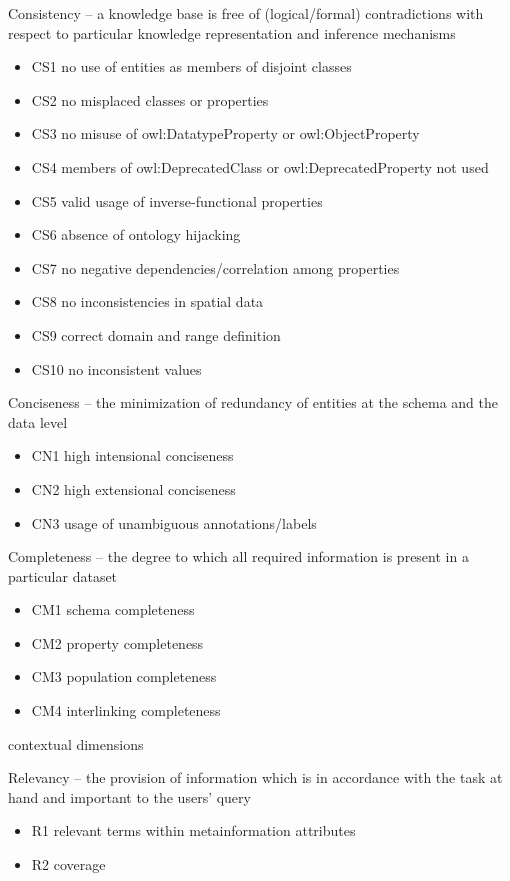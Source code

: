 Consistency -- a knowledge base is free of (logical/formal) contradictions with respect to particular knowledge representation and inference mechanisms
\begin{itemize}
 \setlength{\parskip}{0pt}
 \setlength{\itemsep}{0pt plus 1pt}
 \item CS1 no use of entities as members of disjoint classes
 \item CS2 no misplaced classes or properties
 \item CS3 no misuse of owl:DatatypeProperty or owl:ObjectProperty
 \item CS4 members of owl:DeprecatedClass or owl:DeprecatedProperty not used
 \item CS5 valid usage of inverse-functional properties
 \item CS6 absence of ontology hijacking
 \item CS7 no negative dependencies/correlation among properties
 \item CS8 no inconsistencies in spatial data
 \item CS9 correct domain and range definition
 \item CS10 no inconsistent values
\end{itemize}

Conciseness -- the minimization of redundancy of entities at the schema and the data level
\begin{itemize}
 \setlength{\parskip}{0pt}
 \setlength{\itemsep}{0pt plus 1pt}
 \item CN1 high intensional conciseness
 \item CN2 high extensional conciseness
 \item CN3 usage of unambiguous annotations/labels
\end{itemize}

Completeness -- the degree to which all required information is present in a particular dataset
\begin{itemize}
 \setlength{\parskip}{0pt}
 \setlength{\itemsep}{0pt plus 1pt}
 \item CM1 schema completeness
 \item CM2 property completeness
 \item CM3 population completeness
 \item CM4 interlinking completeness
\end{itemize}

contextual dimensions

Relevancy -- the provision of information which is in accordance with the task at hand and important to the users’ query
\begin{itemize}
 \setlength{\parskip}{0pt}
 \setlength{\itemsep}{0pt plus 1pt}
 \item R1 relevant terms within metainformation attributes
 \item R2 coverage
\end{itemize}

